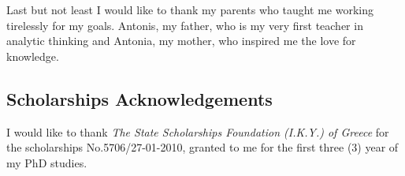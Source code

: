 \documentclass[
    12pt, %
    english, %
    singlespacing, %
    liststotoc, %
    headsepline, %
]{DoctoralThesis} %
\begin{document}
Last but not least I would like to thank my parents who taught me working tirelessly for my goals. Antonis, my father, who is my very first teacher in analytic thinking and Antonia, my mother, who inspired me the love for knowledge. 

\subsection*{Scholarships Acknowledgements}
I would like to thank \textit{The State Scholarships Foundation (I.K.Y.) of Greece} for the scholarships No.5706/27-01-2010, granted to me for the first three (3) year of my PhD studies.


\newpage



\end{document}
